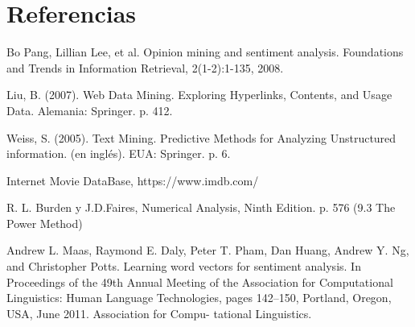 \section{Referencias}
\begin{thebibliography}{9}
Bo Pang, Lillian Lee, et al. Opinion mining and sentiment analysis. Foundations and Trends in Information Retrieval, 2(1-2):1-135, 2008.

Liu, B. (2007). Web Data Mining. Exploring Hyperlinks, Contents, and Usage Data. Alemania: Springer. p. 412.

Weiss, S. (2005). Text Mining. Predictive Methods for Analyzing Unstructured information. (en inglés). EUA: Springer. p. 6.

Internet Movie DataBase, https://www.imdb.com/

R. L. Burden y J.D.Faires, Numerical Analysis, Ninth Edition. p. 576 (9.3 The Power Method)

Andrew L. Maas, Raymond E. Daly, Peter T. Pham, Dan Huang, Andrew Y. Ng, and
Christopher Potts. Learning word vectors for sentiment analysis. In Proceedings of the
49th Annual Meeting of the Association for Computational Linguistics: Human Language
Technologies, pages 142–150, Portland, Oregon, USA, June 2011. Association for Compu-
tational Linguistics.

\end{thebibliography}